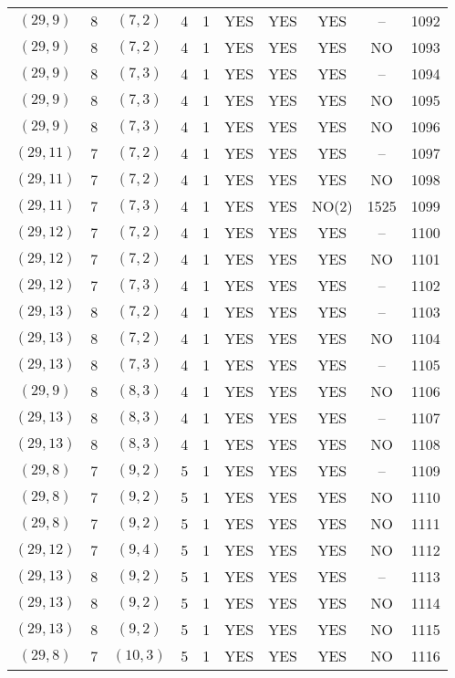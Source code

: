 \begin{longtable}{|c|c|c|c|c|c|c|c|c|c|}
$(29, 9)$ & 8 & $(7, 2)$ & 4 & 1 & YES & YES & YES & -- & 1092\\
$(29, 9)$ & 8 & $(7, 2)$ & 4 & 1 & YES & YES & YES & NO & 1093\\
$(29, 9)$ & 8 & $(7, 3)$ & 4 & 1 & YES & YES & YES & -- & 1094\\
$(29, 9)$ & 8 & $(7, 3)$ & 4 & 1 & YES & YES & YES & NO & 1095\\
$(29, 9)$ & 8 & $(7, 3)$ & 4 & 1 & YES & YES & YES & NO & 1096\\
$(29, 11)$ & 7 & $(7, 2)$ & 4 & 1 & YES & YES & YES & -- & 1097\\
$(29, 11)$ & 7 & $(7, 2)$ & 4 & 1 & YES & YES & YES & NO & 1098\\
$(29, 11)$ & 7 & $(7, 3)$ & 4 & 1 & YES & YES & NO(2) & 1525 & 1099\\
$(29, 12)$ & 7 & $(7, 2)$ & 4 & 1 & YES & YES & YES & -- & 1100\\
$(29, 12)$ & 7 & $(7, 2)$ & 4 & 1 & YES & YES & YES & NO & 1101\\
$(29, 12)$ & 7 & $(7, 3)$ & 4 & 1 & YES & YES & YES & -- & 1102\\
$(29, 13)$ & 8 & $(7, 2)$ & 4 & 1 & YES & YES & YES & -- & 1103\\
$(29, 13)$ & 8 & $(7, 2)$ & 4 & 1 & YES & YES & YES & NO & 1104\\
$(29, 13)$ & 8 & $(7, 3)$ & 4 & 1 & YES & YES & YES & -- & 1105\\
$(29, 9)$ & 8 & $(8, 3)$ & 4 & 1 & YES & YES & YES & NO & 1106\\
$(29, 13)$ & 8 & $(8, 3)$ & 4 & 1 & YES & YES & YES & -- & 1107\\
$(29, 13)$ & 8 & $(8, 3)$ & 4 & 1 & YES & YES & YES & NO & 1108\\
$(29, 8)$ & 7 & $(9, 2)$ & 5 & 1 & YES & YES & YES & -- & 1109\\
$(29, 8)$ & 7 & $(9, 2)$ & 5 & 1 & YES & YES & YES & NO & 1110\\
$(29, 8)$ & 7 & $(9, 2)$ & 5 & 1 & YES & YES & YES & NO & 1111\\
$(29, 12)$ & 7 & $(9, 4)$ & 5 & 1 & YES & YES & YES & NO & 1112\\
$(29, 13)$ & 8 & $(9, 2)$ & 5 & 1 & YES & YES & YES & -- & 1113\\
$(29, 13)$ & 8 & $(9, 2)$ & 5 & 1 & YES & YES & YES & NO & 1114\\
$(29, 13)$ & 8 & $(9, 2)$ & 5 & 1 & YES & YES & YES & NO & 1115\\
$(29, 8)$ & 7 & $(10, 3)$ & 5 & 1 & YES & YES & YES & NO & 1116\\

\end{longtable}
